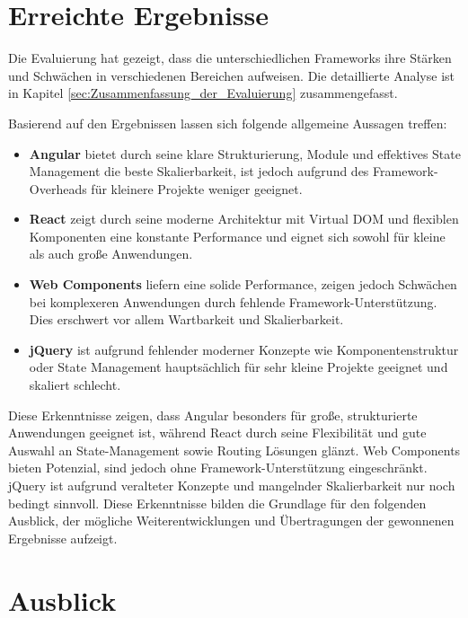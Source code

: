 \documentclass[oneside]{ausarbeitung}
\begin{document}
\section{Erreichte Ergebnisse}
\label{sec:ergebnisse}

Die Evaluierung hat gezeigt, dass die unterschiedlichen Frameworks ihre Stärken und Schwächen in verschiedenen Bereichen aufweisen. Die detaillierte Analyse ist in Kapitel \ref{sec:Zusammenfassung_der_Evaluierung} zusammengefasst. 

Basierend auf den Ergebnissen lassen sich folgende allgemeine Aussagen treffen:

\begin{itemize}
    \item \textbf{Angular} bietet durch seine klare Strukturierung, Module und effektives State Management die beste Skalierbarkeit, ist jedoch aufgrund des Framework-Overheads für kleinere Projekte weniger geeignet.
    \item \textbf{React} zeigt durch seine moderne Architektur mit Virtual DOM und flexiblen Komponenten eine konstante Performance und eignet sich sowohl für kleine als auch große Anwendungen.
    \item \textbf{Web Components} liefern eine solide Performance, zeigen jedoch Schwächen bei komplexeren Anwendungen durch fehlende Framework-Unterstützung. Dies erschwert vor allem Wartbarkeit und Skalierbarkeit.
    \item \textbf{jQuery} ist aufgrund fehlender moderner Konzepte wie Komponentenstruktur oder State Management hauptsächlich für sehr kleine Projekte geeignet und skaliert schlecht.
\end{itemize}

Diese Erkenntnisse zeigen, dass Angular besonders für große, strukturierte Anwendungen geeignet ist, während React durch seine Flexibilität und gute Auswahl an State-Management sowie Routing Lösungen glänzt. Web Components bieten Potenzial, sind jedoch ohne Framework-Unterstützung eingeschränkt. jQuery ist aufgrund veralteter Konzepte und mangelnder Skalierbarkeit nur noch bedingt sinnvoll. Diese Erkenntnisse bilden die Grundlage für den folgenden Ausblick, der mögliche Weiterentwicklungen und Übertragungen der gewonnenen Ergebnisse aufzeigt.

\section{Ausblick}
\label{sec:ausblick}
\end{document}
